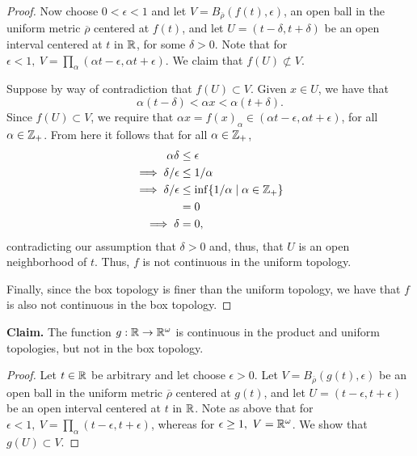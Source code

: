 \begin{solution}
\begin{proof}
        Now choose $0 < \epsilon < 1$ and let $V = B_{\overline{\rho}}(f(t), \epsilon)$, an open ball in the uniform metric $\overline{\rho}$ centered at $f(t)$, and let $U = (t - \delta, t + \delta)$ be an open interval centered at $t$ in $\mathbb{R}$, for some $\delta > 0$.
        Note that for $\epsilon < 1,~ V = \prod_\alpha (\alpha t - \epsilon, \alpha t + \epsilon)$.
        We claim that $f(U) \not\subset V$.

        Suppose by way of contradiction that $f(U) \subset V$.
        Given $x \in U$, we have that
        \begin{equation*}
            \alpha (t - \delta) < \alpha x < \alpha (t + \delta).
        \end{equation*}
        Since $f(U) \subset V$, we require that $\alpha x = f(x)_\alpha \in (\alpha t - \epsilon, \alpha t + \epsilon)$, for all $\alpha \in \mathbb{Z}_+$.
        From here it follows that for all $\alpha \in \mathbb{Z}_+$,
        \begin{align*}
            \alpha \delta               &\leq \epsilon \\
            \implies \delta / \epsilon  &\leq 1 / \alpha \\
            \implies \delta / \epsilon  &\leq \inf\{1 / \alpha \mid \alpha \in \mathbb{Z}_+\} \\
                                        &= 0 \\
            \implies \delta             &= 0,
        \end{align*}
        contradicting our assumption that $\delta > 0$ and, thus, that $U$ is an open neighborhood of $t$.
        Thus, $f$ is not continuous in the uniform topology.

        Finally, since the box topology is finer than the uniform topology, we have that $f$ is also not continuous in the box topology.
    \end{proof}
    \bigskip

    \noindent\textbf{Claim.} The function $g: \mathbb{R} \rightarrow \mathbb{R}^\omega$ is continuous in the product and uniform topologies, but not in the box topology.
    \begin{proof}
        Let $t \in \mathbb{R}$ be arbitrary and let choose $\epsilon > 0$.
        Let $V = B_{\overline{\rho}}(g(t), \epsilon)$ be an open ball in the uniform metric $\overline{\rho}$ centered at $g(t)$, and let $U = (t - \epsilon, t + \epsilon)$ be an open interval centered at $t$ in $\mathbb{R}$.
        Note as above that for $\epsilon < 1,~ V = \prod_\alpha (t - \epsilon, t + \epsilon)$, whereas for $\epsilon \geq 1,~ V = \mathbb{R}^\omega$.
        We show that $g(U) \subset V$.


\end{proof}
\end{solution}
